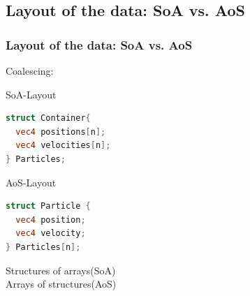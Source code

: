 \documentclass{beamer}
\begin{document}
\subsection{Layout of the data: SoA vs. AoS}
\begin{frame}[fragile]
\frametitle{Layout of the data: SoA vs. AoS}

\begin{minipage}{0.31\textwidth}
\begin{minipage}{0.95\textwidth}
Coalescing:
\vspace*{23}
\end{minipage}
\tiny
\begin{minipage}{0.95\textwidth}
  SoA-Layout
\begin{lstlisting}[language={GLSL},style={GL},basicstyle=\tiny]
struct Container{
  vec4 positions[n];
  vec4 velocities[n];
} Particles;
\end{lstlisting}
\vspace*{29}
\end{minipage}
\begin{minipage}{0.95\textwidth}
  AoS-Layout
\begin{lstlisting}[language={GLSL},style={GL},basicstyle=\tiny]
struct Particle {
  vec4 position;
  vec4 velocity;
} Particles[n];
\end{lstlisting}
\end{minipage}
\end{minipage}
\begin{minipage}{0.64\textwidth}
  \tiny
  
  Structures of arrays(SoA)
\\
  
  Arrays of structures(AoS)

\end{minipage}
\end{frame}
\end{document}
